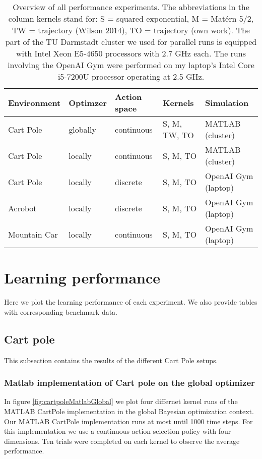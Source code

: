 \begin{table}[h]
    \centering
    \begin{tabular}{|l|l|l|l|l|}\hline
        Environment & Optimzer & Action space & Kernels & Simulation\\\hline
        Cart Pole & globally & continuous & S, M, TW, TO & MATLAB (cluster)\\\hline
        Cart Pole & locally & continuous & S, M, TO & MATLAB (cluster)\\\hline
        Cart Pole & locally & discrete & S, M, TO & OpenAI Gym (laptop)\\\hline
        Acrobot & locally & discrete & S, M, TO & OpenAI Gym (laptop)\\\hline
        Mountain Car & locally & continuous & S, M, TO & OpenAI Gym (laptop)\\\hline
    \end{tabular}
    \caption{Overview of all performance experiments. The abbreviations in the column kernels stand for: S = squared exponential, M = Matérn 5/2, TW = trajectory (Wilson 2014), TO = trajectory (own work). The part of the TU Darmstadt cluster we used for parallel runs is equipped with Intel Xeon E5-4650 processors with 2.7 GHz each. The runs involving the OpenAI Gym were performed on my laptop's Intel Core i5-7200U processor operating at 2.5 GHz.\label{table:xps}}
\end{table}

\newpage
\section{Learning performance}

Here we plot the learning performance of each experiment. We also provide tables with corresponding benchmark data.

\subsection{Cart pole}
This subsection contains the results of the different Cart Pole setups.

\subsubsection{Matlab implementation of Cart pole on the global optimizer}

In figure \ref{fig:cartpoleMatlabGlobal} we plot four differnet kernel runs of the MATLAB CartPole implementation in the global Bayesian optimization context. Our MATLAB CartPole implementation runs at most until 1000 time steps. For this implementation we use a continuous action selection policy with four dimensions. Ten trials were completed on each kernel to observe the average performance.


